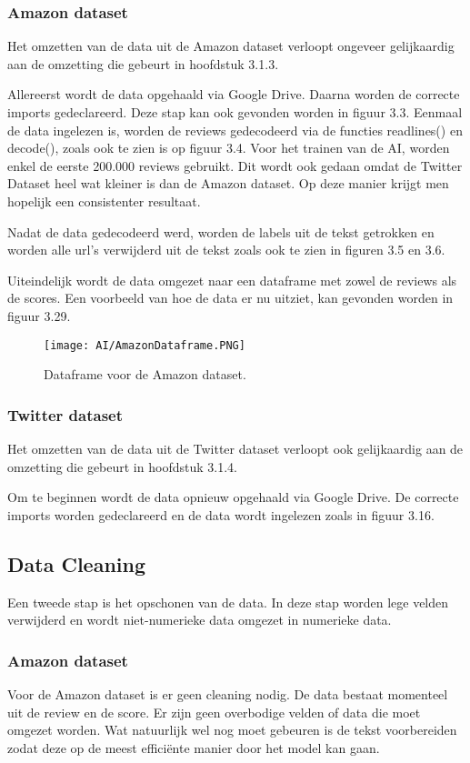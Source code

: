 \subsubsection{Amazon dataset}
Het omzetten van de data uit de Amazon dataset verloopt ongeveer gelijkaardig aan de omzetting die gebeurt in hoofdstuk 3.1.3.
 
Allereerst wordt de data opgehaald via Google Drive. Daarna worden de correcte imports gedeclareerd. Deze stap kan ook gevonden worden in figuur 3.3. Eenmaal de data ingelezen is, worden de reviews gedecodeerd via de functies readlines() en decode(), zoals ook te zien is op figuur 3.4. Voor het trainen van de AI, worden enkel de eerste 200.000 reviews gebruikt. Dit wordt ook gedaan omdat de Twitter Dataset heel wat kleiner is dan de Amazon dataset. Op deze manier krijgt men hopelijk een consistenter resultaat. 

Nadat de data gedecodeerd werd, worden de labels uit de tekst getrokken en worden alle url's verwijderd uit de tekst zoals ook te zien in figuren 3.5 en 3.6. 

Uiteindelijk wordt de data omgezet naar een dataframe met zowel de reviews als de scores. Een voorbeeld van hoe de data er nu uitziet, kan gevonden worden in figuur 3.29.

\begin{figure}[!htbp]
    \texttt{[image: AI/AmazonDataframe.PNG]}
    \caption{\label{amazondataframe}Dataframe voor de Amazon dataset.}
\end{figure}
\FloatBarrier 

\subsubsection{Twitter dataset}
Het omzetten van de data uit de Twitter dataset verloopt ook gelijkaardig aan de omzetting die gebeurt in hoofdstuk 3.1.4.

Om te beginnen wordt de data opnieuw opgehaald via Google Drive. De correcte imports worden gedeclareerd en de data wordt ingelezen zoals in figuur 3.16.

\subsection{Data Cleaning}
\label{proofofconceptdatacleaning}
Een tweede stap is het opschonen van de data. In deze stap worden lege velden verwijderd en wordt niet-numerieke data omgezet in numerieke data.

\subsubsection{Amazon dataset}
Voor de Amazon dataset is er geen cleaning nodig. De data bestaat momenteel uit de review en de score. Er zijn geen overbodige velden of data die moet omgezet worden. Wat natuurlijk wel nog moet gebeuren is de tekst voorbereiden zodat deze op de meest efficiënte manier door het model kan gaan.

